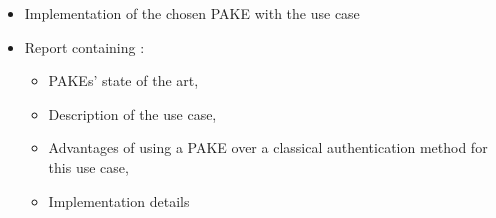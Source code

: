 \documentclass[../report.tex]{subfiles}
\begin{document}
\begin{itemize}
 \item Implementation of the chosen PAKE with the use case
 \item Report containing :
 \begin{itemize}
    \item PAKEs' state of the art,
    \item Description of the use case,
    \item Advantages of using a PAKE over a classical authentication method for this use case,
    \item Implementation details
 \end{itemize}
\end{itemize}
\end{document}
